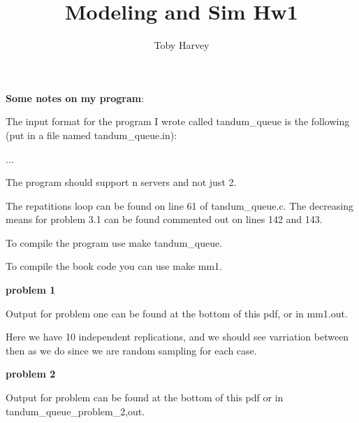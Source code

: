 \documentclass{article}
\begin{document}
\title{Modeling and Sim Hw1}
\author{Toby Harvey}
\maketitle

\noindent \textbf{Some notes on my program}:

\noindent The input format for the program I wrote called tandum\_queue is the following (put in a file named tandum\_queue.in):

\vspace{3mm}

\newline
...\newline

\vspace{3mm}

\noindent The program should support n servers and not just 2.

\vspace{3mm}

\noindent The repatitions loop can be found on line 61 of tandum\_queue.c. The decreasing means for problem 3.1 can be found commented out on lines 142 and 143.

\vspace{3mm}

\noindent To compile the program use make tandum\_queue.

\noindent To compile the book code you can use make mm1.


\vspace{5mm}

\textbf{problem 1}

\noindent Output for problem one can be found at the bottom of this pdf, or in mm1.out.

\noindent Here we have 10 independent replications, and we should see varriation between then as we do since we are random sampling for each case.


\vspace{5mm}

\textbf{problem 2}

\noindent Output for problem can be found at the bottom of this pdf or in tandum\_queue\_problem\_2,out.
\end{document}
